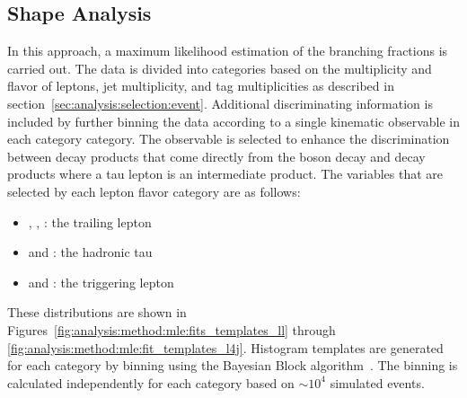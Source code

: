 
\subsection{Shape Analysis}
\label{sec:analysis:method:mle}

In this approach, a maximum likelihood estimation of the branching fractions is carried out.  The data is divided into categories based on the multiplicity and flavor of leptons, jet multiplicity, and \PQb tag multiplicities as described in section~\ref{sec:analysis:selection:event}.  Additional discriminating information is included by further binning the data according to a single kinematic observable in each category category. The observable is selected to enhance the discrimination between decay products that come directly from the \PW boson decay and decay products where a tau lepton is an intermediate product.  The variables that are selected by each lepton flavor category are as follows:
\begin{itemize}
    \item \cee, \cmm, \cem: the trailing lepton \pt
    \item \cet and \cmt: the hadronic tau \pt
    \item \ceh and \cmh: the triggering lepton \pt
\end{itemize}
\noindent These distributions are shown in Figures~\ref{fig:analysis:method:mle:fits_templates_ll} through \ref{fig:analysis:method:mle:fit_templates_l4j}. Histogram templates are generated for each category by binning using the Bayesian Block algorithm~\cite{Pollack:2017srh}.  The binning is calculated independently for each category based on $\sim 10^{4}$ simulated events.
